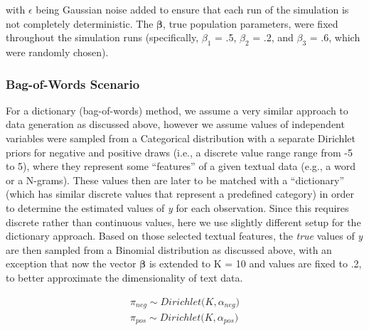 \documentclass[man, 12pt, a4paper, nolmodern, noextraspace]{apa6}
\begin{document}
    
    
 
    \noindent with $\epsilon$ being Gaussian noise added to ensure that each run of the simulation is not completely deterministic. The $\boldsymbol{\beta}$, true population parameters, were fixed throughout the simulation runs (specifically, $\beta_1$ = .5, $\beta_2$ = .2, and $\beta_3$ = .6, which were randomly chosen). 
    
    \subsubsection{Bag-of-Words Scenario}
     For a dictionary (bag-of-words) method, we assume a very similar approach to data generation as discussed above, however we assume values of independent variables were sampled from a Categorical distribution with a separate Dirichlet priors for negative and positive draws (i.e., a discrete value range range from -5 to 5), where they represent some \enquote{features} of a given textual data (e.g., a word or a N-grams). These values then are later to be matched with a \enquote{dictionary} (which has similar discrete values that represent a predefined category) in order to determine the estimated values of \textit{y} for each observation. Since this requires discrete rather than continuous values, here we use slightly different setup for the dictionary approach. Based on those selected textual features, the \textit{true} values of \textit{y} are then sampled from a Binomial distribution as discussed above, with an exception that now the vector $\boldsymbol{\beta}$ is extended to K = 10 and values are fixed to .2, to better approximate the dimensionality of text data.
    
    
    
       \begin{equation}
        \begin{gathered}
%        
%
%
        \pi_{neg} \sim Dirichlet\bigl(K, \alpha_{neg}\bigr) \\
        \pi_{pos} \sim Dirichlet\bigl(K, \alpha_{pos}\bigr)
        \end{gathered}
    \end{equation}
    
\end{document}
